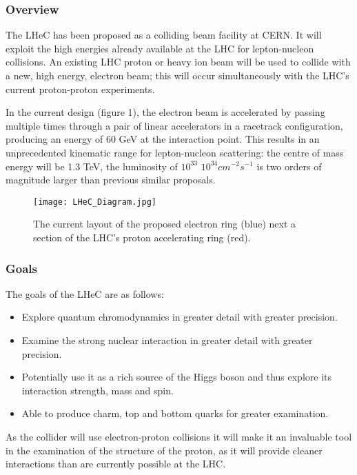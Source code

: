 \subsubsection{Overview \cite{LHeC:Birmingham}}

The LHeC has been proposed as a colliding beam facility at CERN. It will exploit the high energies already available at the LHC for lepton-nucleon collisions. An existing LHC proton or heavy ion beam will be used to collide with a new, high energy, electron beam; this will occur simultaneously with the LHC's current proton-proton experiments.
 
In the current design (figure 1), the electron beam is accelerated by passing multiple times through a pair of linear accelerators in a racetrack configuration, producing an energy of 60 GeV at the interaction point. This results in an unprecedented kinematic range for lepton-nucleon scattering: the centre of mass energy will be 1.3 TeV, the luminosity of $10^{33}$ \textendash $10^{34} cm^{-2}s^{-1}$ is two orders of magnitude larger than previous similar proposals.

\begin{figure}[!htb]
\centering
\texttt{[image: LHeC\_Diagram.jpg]}
\caption{The current layout of the proposed electron ring (blue) next a section of the LHC's proton accelerating ring (red).
}
\end{figure}

\subsubsection{Goals}

The goals of the LHeC are as follows:
\begin{itemize}
\item Explore quantum chromodynamics in greater detail with greater precision.
\item Examine the strong nuclear interaction in greater detail with greater precision.
\item Potentially use it as a rich source of the Higgs boson and thus explore its interaction strength, mass and spin.
\item Able to produce charm, top and bottom quarks for greater examination.
\end{itemize}
As the collider will use electron-proton collisions it will make it an invaluable tool in the examination of the structure of the proton, as it will provide cleaner interactions than are currently possible at the LHC.
 
